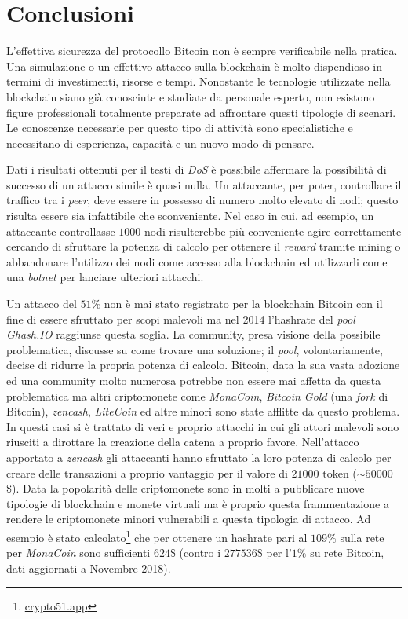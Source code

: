 \chapter*{Conclusioni}
L'effettiva sicurezza del protocollo Bitcoin non è sempre verificabile nella pratica. Una simulazione o un effettivo attacco sulla blockchain è molto dispendioso in termini di investimenti, risorse e tempi. Nonostante le tecnologie utilizzate nella blockchain siano già conosciute e studiate da personale esperto, non esistono figure professionali totalmente preparate ad affrontare questi tipologie di scenari. Le conoscenze necessarie per questo tipo di attività sono specialistiche e necessitano di esperienza, capacità e un nuovo modo di pensare.

Dati i risultati ottenuti per il testi di \textit{DoS} è possibile affermare la possibilità di successo di un attacco simile è quasi nulla. Un attaccante, per poter, controllare il traffico tra i \textit{peer}, deve essere in possesso di numero molto elevato di nodi; questo risulta essere sia infattibile che sconveniente. Nel caso in cui, ad esempio, un attaccante controllasse $1000$ nodi risulterebbe più conveniente agire correttamente cercando di sfruttare la potenza di calcolo per ottenere il \textit{reward} tramite mining o abbandonare l'utilizzo dei nodi come accesso alla blockchain ed utilizzarli come una \textit{botnet} per lanciare ulteriori attacchi.

Un attacco del $51\%$ non è mai stato registrato per la blockchain Bitcoin con il fine di essere sfruttato per scopi malevoli ma nel 2014 l'hashrate del \textit{pool} \textit{Ghash.IO} raggiunse questa soglia. La community, presa visione della possibile problematica, discusse su come trovare una soluzione; il \textit{pool}, volontariamente, decise di ridurre la propria potenza di calcolo. Bitcoin, data la sua vasta adozione ed una community molto numerosa potrebbe non essere mai affetta da questa problematica ma altri criptomonete come \textit{MonaCoin}, \textit{Bitcoin Gold} (una \textit{fork} di Bitcoin), \textit{zencash}, \textit{LiteCoin} ed altre minori sono state afflitte da questo problema. In questi casi si è trattato di veri e proprio attacchi in cui gli attori malevoli sono riusciti a dirottare la creazione della catena a proprio favore. Nell'attacco apportato a \textit{zencash} gli attaccanti hanno sfruttato la loro potenza di calcolo per creare delle transazioni a proprio vantaggio per il valore di $21000$ token ($\sim50000$\$). Data la popolarità delle criptomonete sono in molti a pubblicare nuove tipologie di blockchain e monete virtuali ma è proprio questa frammentazione a rendere le criptomonete minori vulnerabili a questa tipologia di attacco. Ad esempio è stato calcolato\footnote{\href{https://www.crypto51.app/}{crypto51.app}} che per ottenere un hashrate pari al $109\%$ sulla rete per \textit{MonaCoin} sono sufficienti $624$\$ (contro i $277536$\$ per l'$1\%$ su rete Bitcoin, dati aggiornati a Novembre 2018).

